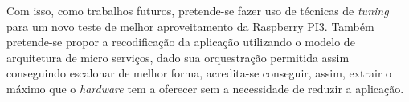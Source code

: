 \documentclass[12pt,english,brazil]{article}
\begin{document}
Com isso, como trabalhos futuros, pretende-se fazer uso de técnicas de \emph{tuning} para um novo teste de melhor aproveitamento da Raspberry PI3. Também pretende-se propor a recodificação da aplicação utilizando o modelo de arquitetura de micro serviços, dado sua orquestração permitida assim conseguindo escalonar de melhor forma, acredita-se conseguir, assim, extrair o máximo que o \emph{hardware} tem a oferecer sem a necessidade de reduzir a aplicação. 




\label{fimdotexto}
\end{document}
